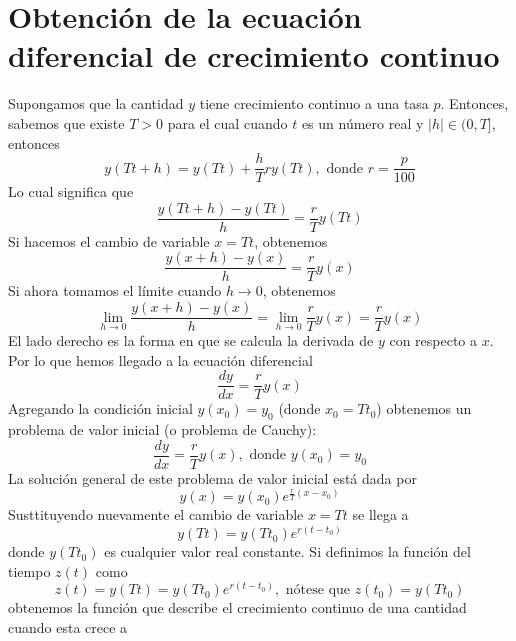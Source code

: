 \documentclass[12pt]{article}
\begin{document}
\section{Obtenci\'{o}n de la ecuaci\'{o}n diferencial de cre\-ci\-mien\-to continuo}
Supongamos que la cantidad $y$ tiene crecimiento continuo a una tasa $p$. Entonces, sabemos que 
existe $T>0$ para el cual cuando $t$ es un n\'{u}mero real y $|h|\in(0,T]$, entonces
\begin{equation}
y(Tt+h)=y(Tt)+\frac{h}{T}ry(Tt),\mbox{\ donde\ }r=\frac{p}{100}
\end{equation}
Lo cual signif\/ica que
\begin{equation}
\frac{y(Tt+h)-y(Tt)}{h}=\frac{r}{T}y(Tt)
\end{equation}
Si hacemos el cambio de variable $x=Tt$, obtenemos
\begin{equation}
\frac{y(x+h)-y(x)}{h}=\frac{r}{T}y(x)
\end{equation}
Si ahora tomamos el l\'{i}mite cuando $h\rightarrow 0$, obtenemos
\begin{equation}
\lim_{h\rightarrow 0}\frac{y(x+h)-y(x)}{h}=\lim_{h\rightarrow 0}\frac{r}{T}y(x)=\frac{r}{T}y(x)
\end{equation}
El lado derecho es la forma en que se calcula la derivada de $y$ con respecto a $x$. Por lo que hemos 
llegado a la ecuaci\'{o}n diferencial
\begin{equation}
\frac{dy}{dx}=\frac{r}{T}y(x)
\end{equation}
Agregando la condici\'{o}n inicial $y(x_{0})=y_{0}$ (donde $x_{0}=Tt_{0}$) obtenemos un problema de valor inicial (o problema 
de Cauchy):
\begin{equation}
\frac{dy}{dx}=\frac{r}{T}y(x),\mbox{\ donde\ }y(x_{0})=y_{0}
\end{equation}
La soluci\'{o}n general de este problema de valor inicial est\'{a} dada por
\begin{equation}
y(x)=y(x_{0})e^{\frac{r}{T}(x-x_{0})}
\end{equation}
Susttituyendo nuevamente el cambio de variable $x=Tt$ se llega a
\begin{equation}
y(Tt)=y(Tt_{0})e^{r(t-t_{0})}
\end{equation}
donde $y(Tt_{0})$ es cualquier valor real constante. Si def\/inimos la funci\'{o}n del tiempo $z(t)$ 
como
\begin{equation}
z(t)=y(Tt)=y(Tt_{0})e^{r(t-t_{0})},\mbox{\ n\'{o}tese que }z(t_{0})=y(Tt_{0})
\end{equation}
obtenemos la funci\'{o}n que describe el crecimiento continuo de una cantidad cuando esta crece a 
\end{document}
